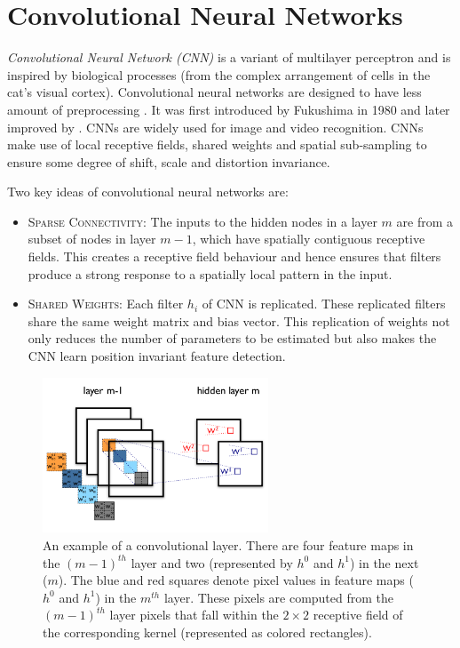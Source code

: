\section{Convolutional Neural Networks}
\emph{Convolutional Neural Network (CNN)} is a variant of multilayer perceptron and is inspired by biological processes (from the complex arrangement of cells in the cat's visual cortex).  Convolutional neural networks are designed to have less amount of preprocessing \cite{lecun1998gradient}.  It was first introduced by Fukushima in 1980 and later improved by \citet{lecun1998gradient}.  CNNs are widely used for image and video recognition.  CNNs make use of local receptive fields, shared weights and spatial sub-sampling to ensure some degree of shift, scale and distortion invariance.

\noindent Two key ideas of convolutional neural networks are:
\begin{itemize}
\item \textsc{Sparse Connectivity:} The inputs to the hidden nodes in a layer $m$ are from a subset of nodes in layer $m-1$, which have spatially contiguous receptive fields.  This creates a receptive field behaviour and hence ensures that filters produce a strong response to a spatially local pattern in the input.


\item \textsc{Shared Weights:} Each filter $h_i$ of CNN is replicated.  These replicated filters share the same weight matrix and bias vector.  This replication of weights not only reduces the number of parameters to be estimated but also makes the CNN learn position invariant feature detection.
\end{itemize}

\begin{figure}[!ht]
\centering
\includegraphics[width=0.6\textwidth]{./imgs/convolution.png} 
\caption[Convolutional layer explained]{An example of a convolutional layer.  There are four feature maps in the ${(m-1)}^{th}$ layer and two (represented by $h^0$ and $h^1$) in the next ($m$).  The blue and red squares denote pixel values in feature maps ($h^0$ and $h^1$) in the $m^{th}$ layer.  These pixels are computed from the $(m-1)^{th}$ layer pixels that fall within the $2\times2$ receptive field of the corresponding kernel (represented as colored rectangles).}
\label{fig:cnn_layer}
\end{figure}


